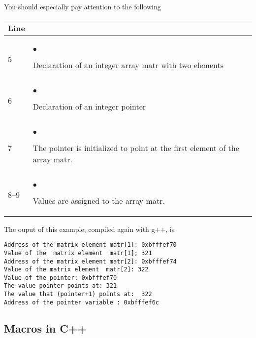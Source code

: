 You should especially pay attention to the following
%
{\small
\begin{center}
%
\begin{tabular}{|ll|}\hline
\hfill Line \hfill
&\hspace*{\fill}  \hspace*{\fill}\\ \hline
&  \\[-2mm]
5 &$\bullet$
\begin{minipage}[t]{0.65\textwidth}
Declaration of an integer array matr with two elements
\end{minipage}\\
6 &$\bullet$
\begin{minipage}[t]{0.65\textwidth}
Declaration of an integer pointer
\end{minipage}\\
7 &$\bullet$
\begin{minipage}[t]{0.65\textwidth}
The pointer is initialized to point at the first element of the 
array matr.
\end{minipage}\\
8--9 &$\bullet$
\begin{minipage}[t]{0.65\textwidth}
Values are assigned to the array matr.
\end{minipage}\\[1ex]  
\hline  
\end{tabular}  
\end{center}  
} %
The ouput of this example, compiled again with g++, is
\begin{svgraybox}
\begin{verbatim}
Address of the matrix element matr[1]: 0xbfffef70
Value of the  matrix element  matr[1]; 321
Address of the matrix element matr[2]: 0xbfffef74
Value of the matrix element  matr[2]: 322
Value of the pointer: 0xbfffef70
The value pointer points at: 321
The value that (pointer+1) points at:  322
Address of the pointer variable : 0xbfffef6c
\end{verbatim}
\end{svgraybox}


\subsection{Macros in C++}

